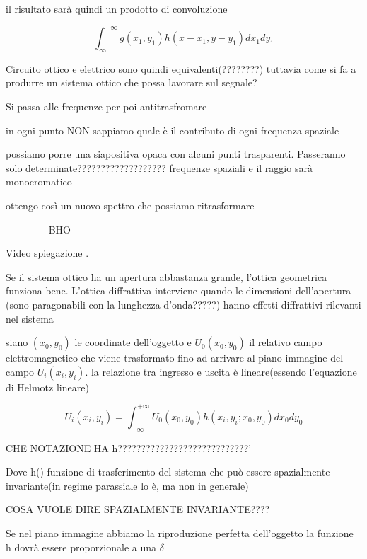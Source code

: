 \documentclass{article}
\begin{document}
il risultato sarà quindi un prodotto di convoluzione 

\begin{equation}
\int_{\infty}^{-\infty} g(x_{1}, y_{1})h(x-x_{1}, y-y_{1})dx_{1} dy_{1}
\end{equation}

Circuito ottico e elettrico sono quindi equivalenti(????????) tuttavia come si fa a produrre un sistema ottico che possa lavorare sul segnale?

Si passa alle frequenze per poi antitrasfromare

in ogni punto NON sappiamo quale è il contributo di ogni frequenza spaziale 

possiamo porre una siapositiva opaca con alcuni punti trasparenti.
Passeranno solo determinate??????????????????? frequenze spaziali 
 e il raggio sarà monocromatico
 
 ottengo così un nuovo spettro che possiamo ritrasformare
 
-------------BHO-------------------




\href{https://www.youtube.com/watch?v=F-S0T4xTdLY}{Video spiegazione }.  %


Se il sistema ottico ha un apertura abbastanza grande, l'ottica geometrica funziona bene. L'ottica diffrattiva interviene quando le dimensioni dell'apertura (sono paragonabili con la lunghezza d'onda?????) hanno effetti diffrattivi rilevanti nel sistema

siano $(x_{0}, y_{0})$  le coordinate dell'oggetto e $U_{0}(x_{0}, y_{0})$ il relativo campo elettromagnetico che viene trasformato fino ad arrivare al piano immagine del campo $U_{i}(x_{i}, y_{i})$. la relazione tra ingresso e uscita è lineare(essendo l'equazione di Helmotz lineare) 

\begin{equation}
U_{i}(x_{i}, y_{i})=\int_{-\infty}^{+\infty} U_{0}(x_{0}, y_{0})h(x_{i}, y_{i} ;x_{0},y_{0})dx_{0} dy_{0}
\end{equation}

CHE NOTAZIONE HA h????????????????????????????'


Dove h() funzione di trasferimento del sistema che può essere spazialmente invariante(in regime parassiale lo è, ma non in generale)

COSA VUOLE DIRE SPAZIALMENTE INVARIANTE????


Se nel piano immagine abbiamo la riproduzione perfetta dell'oggetto la funzione h dovrà essere proporzionale a una $\delta$ 
\end{document}

